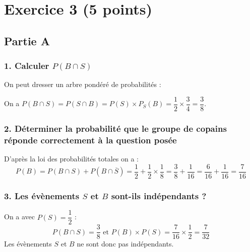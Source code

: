 \section*{Exercice 3 (5 points)}
	
	\subsection*{Partie A}
	
	\subsubsection*{1. Calculer $P(B \cap S)$}
	
	On peut dresser un arbre pondéré de probabilités :
	

	
	On a $P(B \cap S) = P(S \cap B) = P(S) \times P_S(B) = \dfrac{1}{2} \times \dfrac{3}{4} = \dfrac{3}{8}$.
	
	\subsubsection*{2. Déterminer la probabilité que le groupe de copains réponde correctement à la question posée}
	
	D’après la loi des probabilités totales on a :
	\[
	P(B) = P(B \cap S) + P(B \cap \overline{S}) = \dfrac{1}{2} + \dfrac{1}{2} \times \dfrac{1}{8} = \dfrac{3}{8} + \dfrac{1}{16} = \dfrac{6}{16} + \dfrac{1}{16} = \dfrac{7}{16}
	\]
	
	\subsubsection*{3. Les évènements $S$ et $B$ sont-ils indépendants ?}
	
	On a avec $P(S) = \dfrac{1}{2}$ :
	\[
	P(B \cap S) = \dfrac{3}{8} \text{ et } P(B) \times P(S) = \dfrac{7}{16} \times \dfrac{1}{2} = \dfrac{7}{32}
	\]
	Les évènements $S$ et $B$ ne sont donc pas indépendants.
	
